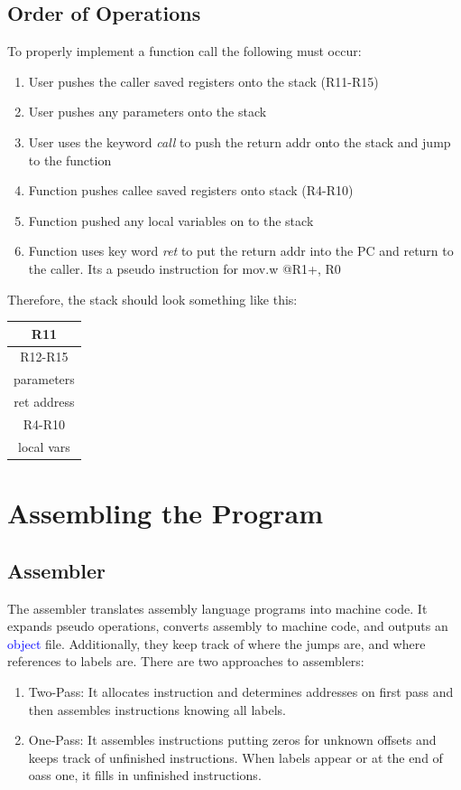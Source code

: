 \documentclass{hw}
\begin{document}
\subsection{Order of Operations}
To properly implement a function call the following must occur:
\begin{enumerate}
  \item User pushes the caller saved registers onto the stack (R11-R15)
  \item User pushes any parameters onto the stack
  \item User uses the keyword \emph{call} to push the return addr onto the stack and jump
  to the function
  \item Function pushes callee saved registers onto stack (R4-R10)
  \item Function pushed any local variables on to the stack
  \item Function uses key word \emph{ret} to put the return addr into the PC and
    return to the caller. Its a pseudo instruction for mov.w @R1+, R0
\end{enumerate}
Therefore, the stack should look something like this:
\begin{table}[h]
\centering
\begin{tabular}{|c|}
  \hline
  R11  \\\hline
  R12-R15  \\\hline
  parameters  \\\hline
  ret address  \\\hline
  R4-R10  \\\hline
  local vars  \\\hline
\end{tabular}
\end{table}


\section{Assembling the Program}
\subsection{Assembler}
The assembler translates assembly language programs into machine code. It expands
pseudo operations, converts assembly to machine code, and outputs an 
\textcolor{blue}{object} file. Additionally, they keep track of where the jumps are,
and where references to labels are. There are two approaches to assemblers:
\begin{enumerate}
  \item Two-Pass: It allocates instruction and determines addresses on first pass
    and then assembles instructions knowing all labels.
  \item One-Pass: It assembles instructions putting zeros for unknown offsets and
    keeps track of unfinished instructions. When labels appear or at the end of
    oass one, it fills in unfinished instructions.
\end{enumerate}
\end{document}
